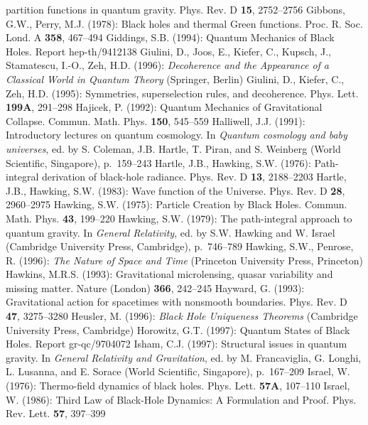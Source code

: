 \begin{thebibliography}
partition functions in quantum gravity. Phys. Rev. D {\bf 15},
2752--2756
%
\bibitem{}{}{}
Gibbons, G.W., Perry, M.J. (1978): Black holes and thermal
Green functions. Proc. R. Soc. Lond. A {\bf 358}, 467--494
%
\bibitem{}{}{}
Giddings, S.B. (1994): Quantum Mechanics of Black Holes.
Report hep-th/9412138
%
\bibitem{}{}{} Giulini, D., Joos, E., Kiefer, C., Kupsch, J.,
Stamatescu, I.-O., Zeh, H.D. (1996): {\it Decoherence and the
Appearance of a Classical World in Quantum Theory} (Springer, Berlin)
%
\bibitem{}{}{}
Giulini, D., Kiefer, C., Zeh, H.D. (1995): Symmetries, superselection
rules, and decoherence. Phys. Lett. {\bf 199A}, 291--298
%
\bibitem{}{}{}
Hajicek, P. (1992): Quantum Mechanics of Gravitational Collapse.
Commun. Math. Phys. {\bf 150}, 545--559
%
\bibitem{}{}{}
Halliwell, J.J. (1991): Introductory lectures on quantum cosmology.
In {\it Quantum cosmology and baby universes}, ed. by S. Coleman,
J.B. Hartle, T. Piran, and S. Weinberg (World Scientific, Singapore),
p.~159--243
%
\bibitem{}{}{}
Hartle, J.B., Hawking, S.W. (1976): Path-integral derivation of
black-hole radiance. Phys. Rev. D {\bf 13}, 2188--2203
%
\bibitem{}{}{}
Hartle, J.B., Hawking, S.W. (1983):
Wave function of the Universe. Phys. Rev. D {\bf 28}, 2960--2975
%
\bibitem{}{}{}
Hawking, S.W. (1975): Particle Creation by Black Holes.
Commun. Math. Phys. {\bf 43}, 199--220
%
\bibitem{}{}{}
Hawking, S.W. (1979): The path-integral approach to quantum gravity.
In {\it General Relativity}, ed. by S.W. Hawking and W. Israel
(Cambridge University Press, Cambridge), p.~746--789
%
\bibitem{}{}{}
Hawking, S.W., Penrose, R. (1996): {\it The Nature of Space and
Time} (Princeton University Press, Princeton)
%
\bibitem{}{}{}
Hawkins, M.R.S. (1993): Gravitational microlensing, quasar variability
and missing matter. Nature (London) {\bf 366}, 242--245
%
\bibitem{}{}{}
Hayward, G. (1993): Gravitational action for spacetimes with
nonsmooth boundaries. Phys. Rev. D {\bf 47}, 3275--3280
%
\bibitem{}{}{}
Heusler, M. (1996): {\it Black Hole Uniqueness Theorems}
(Cambridge University Press, Cambridge)
%
\bibitem{}{}{}
Horowitz, G.T. (1997): Quantum States of Black Holes.
Report gr-qc/9704072
%
\bibitem{}{}{}
Isham, C.J. (1997): Structural issues in quantum gravity.
In {\it General Relativity and Gravitation},
ed. by M. Francaviglia, G. Longhi, L. Lusanna, and E. Sorace
(World Scientific, Singapore), p.~167--209
%
\bibitem{}{}{}
Israel, W. (1976): Thermo-field dynamics of black holes.
Phys. Lett. {\bf 57A}, 107--110
%
\bibitem{}{}{}
Israel, W. (1986): Third Law of Black-Hole Dynamics: A Formulation
and Proof. Phys. Rev. Lett. {\bf 57}, 397--399

\end{thebibliography}
